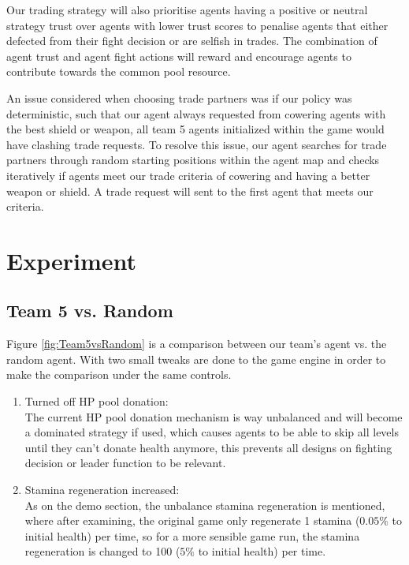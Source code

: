 Our trading strategy will also prioritise agents having a positive or neutral strategy trust over agents with lower trust scores to penalise agents that either defected from their fight decision or are selfish in trades. The combination of agent trust and agent fight actions will reward and encourage agents to contribute towards the common pool resource.

An issue considered when choosing trade partners was if our policy was deterministic, such that our agent always requested from cowering agents with the best shield or weapon, all team 5 agents initialized within the game would have clashing trade requests. To resolve this issue, our agent searches for trade partners through random starting positions within the agent map and checks iteratively if agents meet our trade criteria of cowering and having a better weapon or shield. A trade request will sent to the first agent that meets our criteria.

\section{Experiment}

\subsection{Team 5 vs. Random}
Figure \ref{fig:Team5vsRandom} is a comparison between our team's agent vs. the random agent. With two small tweaks are done to the game engine in order to make the comparison under the same controls.

\begin{enumerate}
    \item Turned off HP pool donation: \\
    The current HP pool donation mechanism is way unbalanced and will become a dominated strategy if used, which causes agents to be able to skip all levels until they can't donate health anymore, this prevents all designs on fighting decision or leader function to be relevant.
    \item Stamina regeneration increased: \\
    As on the demo section, the unbalance stamina regeneration is mentioned, where after examining, the original game only regenerate 1 stamina ($0.05\%$ to initial health) per time, so for a more sensible game run, the stamina regeneration is changed to 100 ($5\%$ to initial health) per time.
\end{enumerate}

